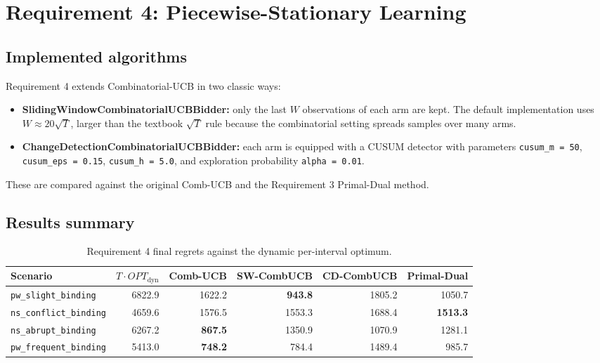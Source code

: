 \documentclass[11pt,a4paper]{article}
\begin{document}
\section{Requirement 4: Piecewise-Stationary Learning}

\subsection{Implemented algorithms}

Requirement 4 extends Combinatorial-UCB in two classic ways:

\begin{itemize}
  \item \textbf{SlidingWindowCombinatorialUCBBidder:} only the last $W$
  observations of each arm are kept. The default implementation uses
  $W \approx 20\sqrt{T}$, larger than the textbook $\sqrt{T}$ rule because the
  combinatorial setting spreads samples over many arms.
  \item \textbf{ChangeDetectionCombinatorialUCBBidder:} each arm is equipped with
  a CUSUM detector with parameters
  \texttt{cusum\_m = 50}, \texttt{cusum\_eps = 0.15},
  \texttt{cusum\_h = 5.0}, and exploration probability
  \texttt{alpha = 0.01}.
\end{itemize}

These are compared against the original Comb-UCB and the Requirement 3
Primal-Dual method.

\subsection{Results summary}

\begin{table}[H]
\centering
\small
\begin{tabular}{lrrrrr}
\toprule
Scenario & $T\!\cdot\!OPT_{\text{dyn}}$ & Comb-UCB & SW-CombUCB & CD-CombUCB & Primal-Dual \\
\midrule
\texttt{pw\_slight\_binding} & 6822.9 & 1622.2 & \textbf{943.8} & 1805.2 & 1050.7 \\
\texttt{ns\_conflict\_binding} & 4659.6 & 1576.5 & 1553.3 & 1688.4 & \textbf{1513.3} \\
\texttt{ns\_abrupt\_binding} & 6267.2 & \textbf{867.5} & 1350.9 & 1070.9 & 1281.1 \\
\texttt{pw\_frequent\_binding} & 5413.0 & \textbf{748.2} & 784.4 & 1489.4 & 985.7 \\
\bottomrule
\end{tabular}
\caption{Requirement 4 final regrets against the dynamic per-interval optimum.}
\end{table}
\end{document}
